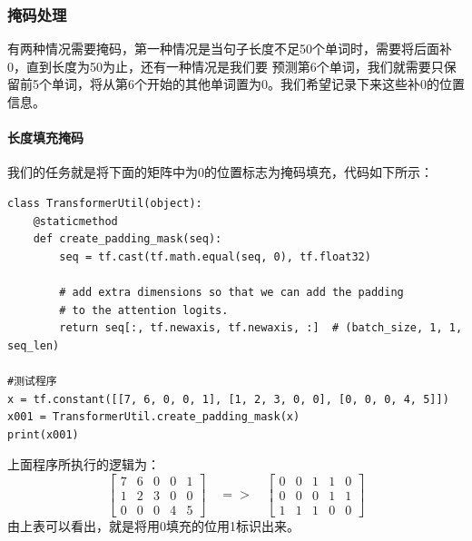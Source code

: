 \documentclass{article}
\begin{document}
\subsubsection{掩码处理}
有两种情况需要掩码，第一种情况是当句子长度不足50个单词时，需要将后面补0，直到长度为50为止，还有一种情况是我们要
预测第6个单词，我们就需要只保留前5个单词，将从第6个开始的其他单词置为0。我们希望记录下来这些补0的位置信息。
\paragraph{长度填充掩码}
我们的任务就是将下面的矩阵中为0的位置标志为掩码填充，代码如下所示：
\begin{lstlisting}
class TransformerUtil(object):
    @staticmethod
    def create_padding_mask(seq):
        seq = tf.cast(tf.math.equal(seq, 0), tf.float32)
        
        # add extra dimensions so that we can add the padding
        # to the attention logits.
        return seq[:, tf.newaxis, tf.newaxis, :]  # (batch_size, 1, 1, seq_len)

#测试程序
x = tf.constant([[7, 6, 0, 0, 1], [1, 2, 3, 0, 0], [0, 0, 0, 4, 5]])
x001 = TransformerUtil.create_padding_mask(x)
print(x001)
\end{lstlisting}
上面程序所执行的逻辑为：
\begin{equation}
\begin{bmatrix}
7 & 6 & 0 & 0 & 1 \\
1 & 2 & 3 & 0 & 0 \\
0 & 0 & 0 & 4 & 5
\end{bmatrix} \quad => \quad 
\begin{bmatrix}
0 & 0 & 1 & 1 & 0 \\
0 & 0 & 0 & 1 & 1 \\
1 & 1 & 1 & 0 & 0
\end{bmatrix}
\label{e000105}
\end{equation}
由上表可以看出，就是将用0填充的位用1标识出来。
\end{document}
